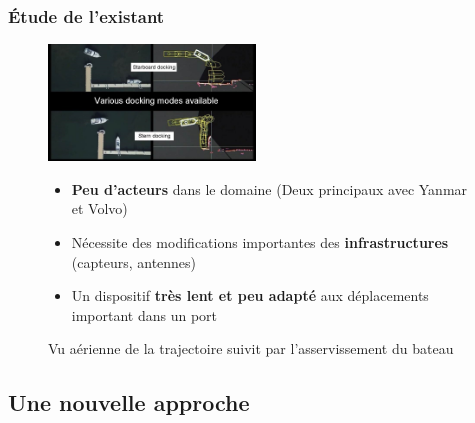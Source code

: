 \documentclass[8pt]{beamer}
\begin{document}
\begin{frame}
  \frametitle{Étude de l'existant}

   \begin{figure}
    \begin{minipage}[c]{.46\linewidth}
        \centering
        \includegraphics[width=55mm]{boat_docking.jpg}
        \caption{Vu aérienne de la trajectoire suivit par l'asservissement du bateau \footnotemark}
    \end{minipage}
    \hfill%
    \begin{minipage}[c]{.46\linewidth}
        \centering
        \begin{itemize}
        \item \textbf{Peu d'acteurs} dans le domaine (Deux principaux avec Yanmar et Volvo) \break
          \pause
        \item Nécessite des modifications importantes des \textbf{infrastructures} (capteurs, antennes) \break
          \pause
        \item Un dispositif \textbf{très lent et peu adapté} aux déplacements important dans un port 
        \end{itemize}
    \end{minipage}
     
\end{figure}
\end{frame}

\subsection{Une nouvelle approche}
\end{document}
